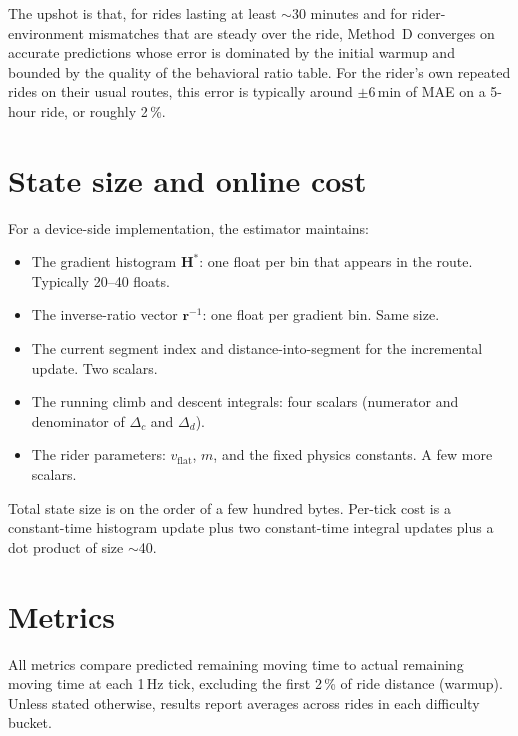 \documentclass[11pt,a4paper]{article}
\begin{document}
The upshot is that, for rides lasting at least $\sim$30 minutes and
for rider-environment mismatches that are steady over the ride,
Method~D converges on accurate predictions whose error is dominated
by the initial warmup and bounded by the quality of the behavioral
ratio table. For the rider's own repeated rides on their usual routes,
this error is typically around $\pm$6\,\si{\minute} of MAE on a 5-hour
ride, or roughly 2\,\%.

\section{State size and online cost}

For a device-side implementation, the estimator maintains:
\begin{itemize}
  \item The gradient histogram $\mathbf{H}^{\ast}$: one float per
        bin that appears in the route. Typically 20--40 floats.
  \item The inverse-ratio vector $\mathbf{r}^{-1}$: one float per
        gradient bin. Same size.
  \item The current segment index and distance-into-segment for the
        incremental update. Two scalars.
  \item The running climb and descent integrals: four scalars
        (numerator and denominator of $\Delta_c$ and $\Delta_d$).
  \item The rider parameters: $v_{\text{flat}}$, $m$, and the fixed
        physics constants. A few more scalars.
\end{itemize}
Total state size is on the order of a few hundred bytes. Per-tick
cost is a constant-time histogram update plus two constant-time
integral updates plus a dot product of size $\sim$40.

\section{Metrics}
\label{sec:metrics}

All metrics compare predicted remaining moving time to actual
remaining moving time at each 1\,\si{\hertz} tick, excluding the
first 2\,\% of ride distance (warmup). Unless stated otherwise,
results report averages across rides in each difficulty bucket.
\end{document}
